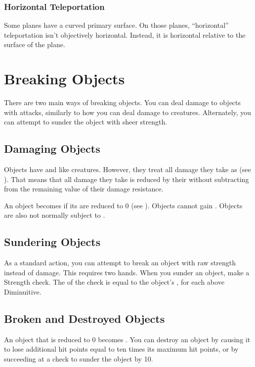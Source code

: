         \subsubsection{Horizontal Teleportation}
            Some planes have a curved primary surface.
            On those planes, ``horizontal'' teleportation isn't objectively horizontal.
            Instead, it is horizontal relative to the surface of the plane.

\section{Breaking Objects}
    There are two main ways of breaking objects.
    You can deal damage to objects with attacks, similarly to how you can deal damage to creatures.
    Alternately, you can attempt to sunder the object with sheer strength.

    \subsection{Damaging Objects}
        Objects have  and  like creatures.
        However, they treat all damage they take as  (see ).
        That means that all damage they take is reduced by their  without subtracting from the remaining value of their damage resistance.

        An object becomes  if its  are reduced to 0 (see ).
        Objects cannot gain .
        Objects are also not normally subject to .

    \subsection{Sundering Objects}
        As a standard action, you can attempt to break an object with raw strength instead of damage.
        This requires two hands.
        When you sunder an object, make a Strength check.
        The  of the check is equal to the object's ,  for each  above Diminuitive.

    \subsection{Broken and Destroyed Objects}\label{Broken and Destroyed Objects}
        An object that is reduced to 0  becomes .
        You can destroy an object by causing it to lose additional hit points equal to ten times its maximum hit points, or by succeeding at a check to sunder the object by 10.

